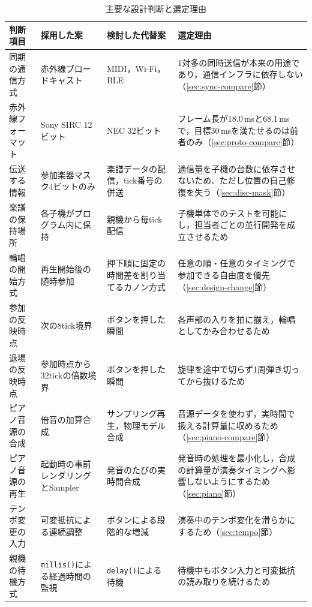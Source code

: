 \documentclass[uplatex,dvipdfmx]{jlreq}
\begin{document}
\begin{table}[tb]
\caption{主要な設計判断と選定理由}
\label{tab:decisions}
\begin{center}
\footnotesize
\begin{tabular}{p{7em}p{7.5em}p{7.5em}p{11em}}
\hline
判断項目 & 採用した案 & 検討した代替案 & 選定理由 \\
\hline
同期の通信方式 & 赤外線ブロードキャスト & MIDI，Wi-Fi，BLE & 1対多の同時送信が本来の用途であり，通信インフラに依存しない（\ref{sec:sync-compare}節） \\
赤外線フォーマット & Sony SIRC 12ビット & NEC 32ビット & フレーム長が18.0\,msと68.1\,msで，目標30\,msを満たせるのは前者のみ（\ref{sec:proto-compare}節） \\
伝送する情報 & 参加楽器マスク4ビットのみ & 楽譜データの配信，tick番号の併送 & 通信量を子機の台数に依存させないため．ただし位置の自己修復を失う（\ref{sec:disc-mask}節） \\
楽譜の保持場所 & 各子機がプログラム内に保持 & 親機から毎tick配信 & 子機単体でのテストを可能にし，担当者ごとの並行開発を成立させるため \\
輪唱の開始方式 & 再生開始後の随時参加 & 押下順に固定の時間差を割り当てるカノン方式 & 任意の順・任意のタイミングで参加できる自由度を優先（\ref{sec:design-change}節） \\
参加の反映時点 & 次の8tick境界 & ボタンを押した瞬間 & 各声部の入りを拍に揃え，輪唱としてかみ合わせるため \\
退場の反映時点 & 参加時点から32tickの倍数境界 & ボタンを押した瞬間 & 旋律を途中で切らず1周弾き切ってから抜けるため \\
ピアノ音源の合成 & 倍音の加算合成 & サンプリング再生，物理モデル合成 & 音源データを使わず，実時間で扱える計算量に収めるため（\ref{sec:piano-compare}節） \\
ピアノ音源の再生 & 起動時の事前レンダリングとSampler & 発音のたびの実時間合成 & 発音時の処理を最小化し，合成の計算量が演奏タイミングへ影響しないようにするため（\ref{sec:piano}節） \\
テンポ変更の入力 & 可変抵抗による連続調整 & ボタンによる段階的な増減 & 演奏中のテンポ変化を滑らかにするため（\ref{sec:tempo}節） \\
親機の待機方式 & \texttt{millis()}による経過時間の監視 & \texttt{delay()}による待機 & 待機中もボタン入力と可変抵抗の読み取りを続けるため \\
\hline
\end{tabular}
\end{center}
\end{table}
\end{document}
